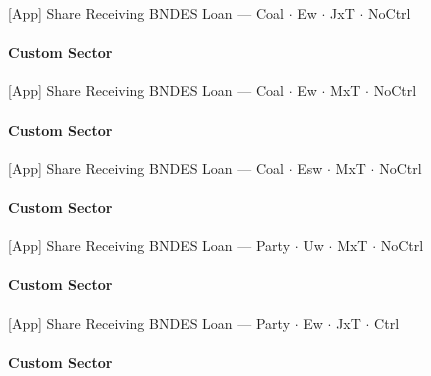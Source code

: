 \documentclass[aspectratio=169,10pt]{beamer}
\newcommand{\tgroup}{../tables/agg_firm_grouped}
\begin{document}
\begin{frame}[t,shrink=5]{[App] Share Receiving BNDES Loan --- Coal $\cdot$ Ew $\cdot$ JxT $\cdot$ NoCtrl}
\framesubtitle{Custom Sector}
\begin{center}\footnotesize

\end{center}
\end{frame}

\begin{frame}[t,shrink=5]{[App] Share Receiving BNDES Loan --- Coal $\cdot$ Ew $\cdot$ MxT $\cdot$ NoCtrl}
\framesubtitle{Custom Sector}
\begin{center}\footnotesize

\end{center}
\end{frame}

\begin{frame}[t,shrink=5]{[App] Share Receiving BNDES Loan --- Coal $\cdot$ Esw $\cdot$ MxT $\cdot$ NoCtrl}
\framesubtitle{Custom Sector}
\begin{center}\footnotesize

\end{center}
\end{frame}

\begin{frame}[t,shrink=5]{[App] Share Receiving BNDES Loan --- Party $\cdot$ Uw $\cdot$ MxT $\cdot$ NoCtrl}
\framesubtitle{Custom Sector}
\begin{center}\footnotesize

\end{center}
\end{frame}

\begin{frame}[t,shrink=5]{[App] Share Receiving BNDES Loan --- Party $\cdot$ Ew $\cdot$ JxT $\cdot$ Ctrl}
\framesubtitle{Custom Sector}
\begin{center}\footnotesize

\end{center}
\end{frame}
\end{document}
